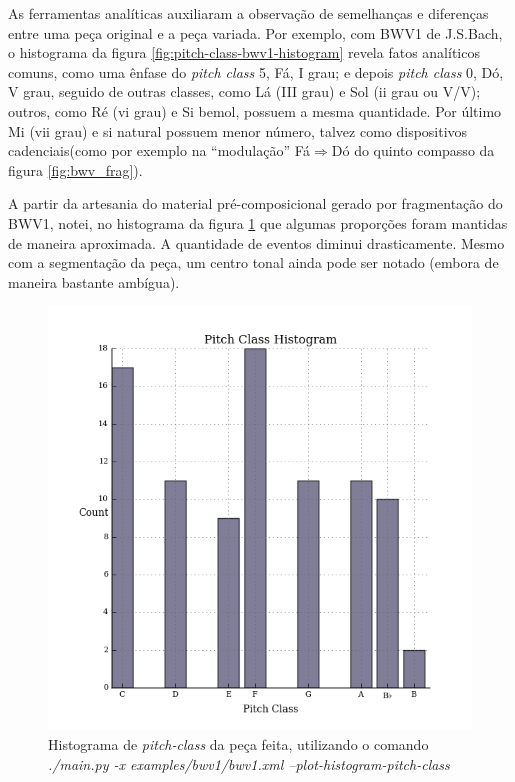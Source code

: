 As ferramentas analíticas auxiliaram a observação de semelhanças e diferenças entre uma peça original  e a peça variada. Por exemplo, com BWV1 de J.S.Bach, o histograma da figura \ref{fig:pitch-class-bwv1-histogram} revela fatos analíticos comuns, como uma ênfase do \emph{pitch class} 5, Fá, I grau; e depois \emph{pitch class} 0, Dó, V grau, seguido de outras classes, como Lá (III grau) e Sol (ii grau ou V/V); outros, como Ré (vi grau) e Si bemol, possuem a mesma quantidade. Por último Mi (vii grau) e si natural possuem menor número, talvez como dispositivos cadenciais(como por exemplo na ``modulação'' Fá$\Rightarrow$Dó do quinto compasso da figura \ref{fig:bwv_frag}).

A partir da artesania do material pré-composicional gerado por fragmentação do BWV1, notei, no histograma da figura \ref{fig:pitch-class-bwv1-histogram-2} que algumas proporções foram mantidas de maneira aproximada. A quantidade de eventos diminui drasticamente. Mesmo com a segmentação da peça, um centro tonal ainda pode ser notado (embora de maneira bastante ambígua).

\begin{figure}[!h]
  \centering
  \includegraphics[scale=0.71]{../analysis/bwv1/pitch-class-1.png}
  \caption{Histograma de \emph{pitch-class} da peça feita, utilizando o comando \emph{./main.py -x examples/bwv1/bwv1.xml --plot-histogram-pitch-class}}
    \label{fig:pitch-class-bwv1-histogram-2}
\end{figure}

